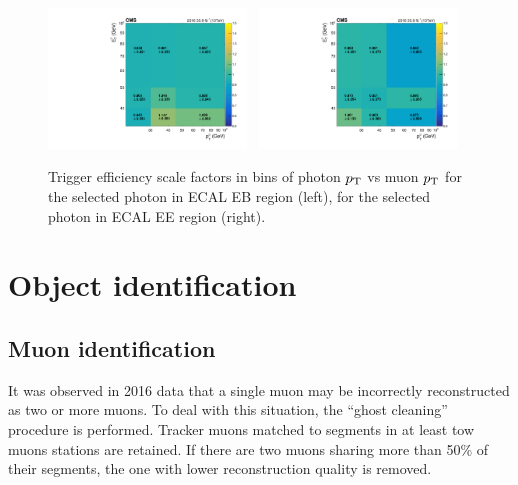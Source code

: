 		\begin{figure}[p]
		        \centering
		    \includegraphics[width=0.47\textwidth]{Fig/Trigger/HZZID/TriggerEff_SFs_FinalVer_withSysUn_EB}~
		    \includegraphics[width=0.47\textwidth]{Fig/Trigger/HZZID/TriggerEff_SFs_FinalVer_withSysUn_EE}\\
		    \caption[Trigger Efficiency Scale factor]{\label{fig:TrigEff}
		        Trigger efficiency scale factors in bins of photon $p_{\mathrm{T}}$ vs muon $p_{\mathrm{T}}$ for the selected photon in ECAL EB region (left), for the selected photon in ECAL EE region (right).}
		\end{figure}
	
	\clearpage
	
\section{Object identification}
	\subsection{Muon identification}
		\label{sec:muonid}
		It was observed in 2016 data that a single muon may be incorrectly reconstructed as two or more muons. To deal with this situation, the ``ghost cleaning'' procedure is performed. Tracker muons matched to segments in at least tow muons stations are retained. If there are two muons sharing more than 50\% of their segments, the one with lower reconstruction quality is removed.
	
